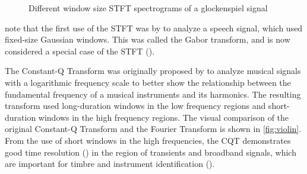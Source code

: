\documentclass[report.tex]{subfiles}
\begin{document}
\begin{figure}[ht]
	\centering
	\hspace{0.5em}
	\caption{Different window size STFT spectrograms of a glockenspiel signal}
	\label{fig:stfttradeoff}
\end{figure}

\textcite{dictionary} note that the first use of the STFT was by \textcite{gabor1946} to analyze a speech signal, which used fixed-size Gaussian windows. This was called the Gabor transform, and is now considered a special case of the STFT (\cite{dictionary}).

The Constant-Q Transform was originally proposed by \textcite{jbrown} to analyze musical signals with a logarithmic frequency scale to better show the relationship between the fundamental frequency of a musical instruments and its harmonics. The resulting transform used long-duration windows in the low frequency regions and short-duration windows in the high frequency regions. The visual comparison of the original Constant-Q Transform and the Fourier Transform is shown in \ref{fig:violin}. From the use of short windows in the high frequencies, the CQT demonstrates good time resolution (\cite{cqtransient}) in the region of transients and broadband signals, which are important for timbre and instrument identification (\cite{timbretransients1, timbretransients2}).
\end{document}
